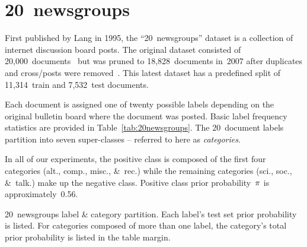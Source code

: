 \section{20~newsgroups}\label{sec:20newsgroups}

First published by Lang in 1995, the ``20~newsgroups'' dataset is a collection of internet discussion board posts.  The original dataset consisted of 20,000~documents~\cite{20newsgroups} but was pruned to 18,828~documents in~2007 after duplicates and cross\-/posts were removed~\cite{Rennie:2007}.   This latest dataset has a predefined split of 11,314~train and 7,532~test documents.

Each document is assigned one of twenty possible labels depending on the original bulletin board where the document was posted.  Basic label frequency statistics are provided in Table~\ref{tab:20newsgroups}. The 20~document labels partition into seven super-classes -- referred to here as \textit{categories}.

In all of our experiments, the positive class is composed of the first four categories (alt., comp., misc., \&~rec.) while the remaining categories (sci., soc., \&~talk.) make up the negative class. Positive class prior probability~$\pi$ is approximately~0.56.

\begin{table}[t]
  \centering
  \caption{20~newsgroups label \& category partition.  Each label's test set prior probability is listed.  For categories composed of more than one label, the category's total prior probability is listed in the table margin.}\label{tab:20newsgroups}
  
\end{table}


